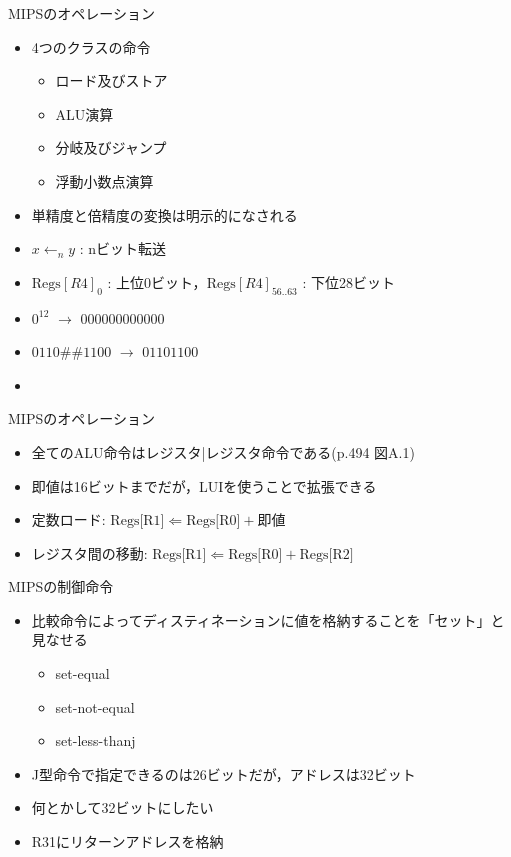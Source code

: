 \documentclass[dvipdfmx]{beamer}
\begin{document}
	\begin{frame}{MIPSのオペレーション}
		\begin{itemize}
			\item 4つのクラスの命令
				\begin{itemize}
					\item ロード及びストア
					\item ALU演算
					\item 分岐及びジャンプ
					\item 浮動小数点演算
				\end{itemize}
			\item 単精度と倍精度の変換は明示的になされる
			\item $x \leftarrow_{n} y$ : nビット転送
			\item $\mbox{Regs}[R4]_0$ : 上位0ビット，$\mbox{Regs}[R4]_{56..63}$ : 下位28ビット
			\item $0^{12}$ $\to$ $000000000000$
			\item $0110 \#\# 1100$ $\to$ $01101100$
			\item {}
		\end{itemize}
	\end{frame}

	\begin{frame}{MIPSのオペレーション}
		\begin{itemize}
			\item 全てのALU命令はレジスタ|レジスタ命令である(p.494 図A.1)
			\item 即値は16ビットまでだが，LUIを使うことで拡張できる
			\item 定数ロード: $\mbox{Regs[R1]} \Leftarrow \mbox{Regs[R0]} + \mbox{即値}$
			\item レジスタ間の移動: $\mbox{Regs[R1]} \Leftarrow \mbox{Regs[R0]} + \mbox{Regs[R2]}$
		\end{itemize}
	\end{frame}

	\begin{frame}{MIPSの制御命令}
		\begin{itemize}
			\item 比較命令によってディスティネーションに値を格納することを「セット」と見なせる
			\begin{itemize}
				\item set-equal
				\item set-not-equal
				\item set-less-thanj
			\end{itemize}
			\item J型命令で指定できるのは26ビットだが，アドレスは32ビット
			\item 何とかして32ビットにしたい
			\item R31にリターンアドレスを格納
		\end{itemize}
	\end{frame}
\end{document}

